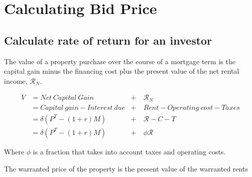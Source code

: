 \chapter[Bidding]{Calculating Bid Price}
\label{AppendixBidPrice}

\section{Calculate rate of return for an investor}
The value of a property purchase over the course of a mortgage term is the \gls{capital gain} minus the financing cost plus the \gls{present value} of the net rental income, $\mathcal{R}_N$. 



\begin{align}
V  	& = Net\ Capital\ Gain & +\ & \mathcal{R}_N \\
    & =  Capital\ gain - Interest\ due      &+\ &   Rent  - Operating\ cost - Taxes \nonumber \\
    &= \delta(P^T- (1+r)M)  & +\ & \mathcal{R} -C - T  \\
    &= \delta(P^T- (1+r)M)  & +\ & \phi\mathcal{R}\label{eq:Value}
\end{align}

Where $\phi$ is a fraction that takes into account taxes and operating costs. 


 The warranted price of the property is the present value of the \gls{warranted rents}
 


